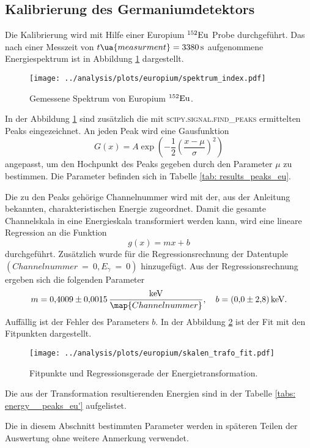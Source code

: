 \subsection{Kalibrierung des Germaniumdetektors}\label{sec:kalibrierung}
\FloatBarrier
Die Kalibrierung wird mit Hilfe einer Europium $^{152}\ce{Eu}$ Probe
durchgeführt. Das nach einer Messzeit von $t\ua{measurment}=\SI{3380}{\second}$
aufgenommene Energiespektrum ist in Abbildung \ref{fig:spectrum_europ} dargestellt.
\begin{figure}
  \centering
  \texttt{[image: ../analysis/plots/europium/spektrum\_index.pdf]}
  \caption{Gemessene Spektrum von Europium $^{152}\ce{Eu}$.}
  \label{fig:spectrum_europ}
\end{figure}
In der Abbildung \ref{fig:spectrum_europ} sind zusätzlich die mit
\textsc{scipy.signal.find\_{peaks}} ermittelten Peaks eingezeichnet.
An jeden Peak wird eine Gausfunktion
\begin{equation}
  \label{eq:gaus}
  G(x)=A\exp{\left(-\frac{1}{2}\left(\frac{x-\mu}{\sigma}\right)^2\right)}
\end{equation}
angepasst, um den Hochpunkt des Peaks gegeben durch den Parameter $\mu$ zu
bestimmen. Die Parameter befinden sich in Tabelle \ref{tab: results_peaks_eu}.

Die zu den Peaks gehörige Channelnummer wird mit der, aus der Anleitung \cite{anleitungV18}
bekannten, charakteristischen Energie zugeordnet.
Damit die gesamte Channelskala in eine Energieskala transformiert werden kann,
wird eine lineare Regression an die Funktion
\begin{equation*}
  g(x)=mx+b
\end{equation*}
durchgeführt. Zusätzlich wurde für die Regressionsrechnung der Datentuple\newline
$(Channelnummer~=~0,E_\gamma~=~0)$ hinzugefügt.
 Aus der Regressionsrechnung ergeben sich die folgenden Parameter
\begin{equation}
  \label{eq:channel_energie_trafo}
  m=\num{0.4009\pm0.0015}\,\frac{\si{\kilo\eV}}{\map{Channelnummer}}, \quad b=\SI{0.0\pm2.8}{\kilo\eV}.
\end{equation}
Auffällig ist der Fehler des Parameters $b$.
In der Abbildung \ref{fig:skalen_trafo_fit} ist der Fit mit den Fitpunkten dargestellt.
\begin{figure}
  \centering
  \texttt{[image: ../analysis/plots/europium/skalen\_trafo\_fit.pdf]}
  \caption{Fitpunkte und Regressionsgerade der Energietransformation.}
  \label{fig:skalen_trafo_fit}
\end{figure}
Die aus der Transformation resultierenden Energien sind in der Tabelle \ref{tabs: energy__peaks_eu'}
aufgelistet.

Die in diesem Abschnitt bestimmten Parameter werden in späteren Teilen der Auswertung
ohne weitere Anmerkung verwendet.
\FloatBarrier

